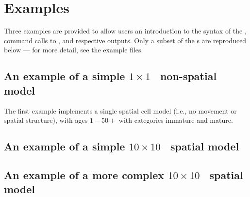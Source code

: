 
\section{Examples\label{sec:examples}}

Three examples are provided to allow users an introduction to the syntax of the \config, command calls to \SPM, and respective outputs. Only a subset of the \config s are reproduced below --- for more detail, see the example files.

\subsection{An example of a simple
  \texorpdfstring{$ 1 \times 1 $}{%
    1 x 1
  }%
\ non-spatial model\label{example1}} 


The first example implements a single spatial cell model (i.e., no movement or spatial structure), with ages $1-50+$ with categories immature and mature. 

 

\subsection{An example of a simple
  \texorpdfstring{$ 10 \times 10 $}{%
    10 x 10 
  }%
\ spatial model\label{example2}} 

 

\subsection{An example of a more complex
  \texorpdfstring{$ 10 \times 10 $}{%
    10 x 10 
  }%
\ spatial model\label{example3}} 

 

